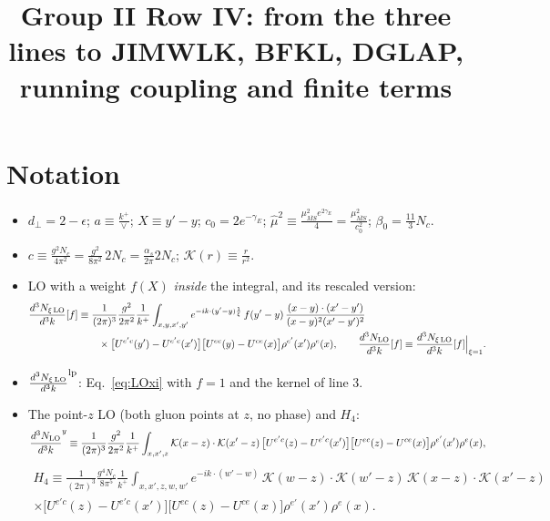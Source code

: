 \documentclass[10pt]{article}
\title{Group II Row IV: from the three lines to JIMWLK, BFKL, DGLAP, running coupling and finite terms}
\date{}
\numberwithin{equation}{section}
\newcommand{\MSb}{\overline{MS}}
\newcommand{\NLO}[1]{\frac{d^3N_{#1}}{d^3k}}
\begin{document}
\maketitle

\section{Notation}
\begin{itemize}
\item $d_\perp=2-\epsilon$; $a\equiv\frac{k^+}{\vee}$; $X\equiv y'-y$; $c_0=2e^{-\gamma_E}$; $\hat\mu^2\equiv\frac{\mu^2_{\MSb}e^{2\gamma_E}}{4}=\frac{\mu^2_{\MSb}}{c_0^2}$; $\beta_0=\frac{11}{3}N_c$.
\item $c\equiv\frac{g^2N_c}{4\pi^2}=\frac{g^2}{8\pi^2}\,2N_c=\frac{\alpha_s}{2\pi}2N_c$; $\mathcal K(r)\equiv\frac{r}{r^2}$.
\item LO with a weight $f(X)$ \emph{inside} the integral, and its rescaled version:
\begin{align}
\NLO{\xi\,\rm LO}[f]&\equiv\frac{1}{(2\pi)^{3}}\frac{g^{2}}{2\pi^{2}}\frac{1}{k^{+}}\int_{x,y,x',y'}e^{-ik\cdot(y'-y)\frac1\xi}\,f(y'-y)\,\frac{(x-y)\cdot(x'-y')}{(x-y)^{2}(x'-y')^{2}}\notag\\
&\qquad\times\big[U^{e'c}(y')-U^{e'c}(x')\big]\big[U^{ec}(y)-U^{ce}(x)\big]\rho^{e'}(x')\rho^{e}(x),\qquad \NLO{\rm LO}[f]\equiv\NLO{\xi\,\rm LO}[f]\Big|_{\xi=1}.\label{eq:LOxi}
\end{align}
\item $\NLO{\xi\,\rm LO}^{\rm lp}$: Eq.~\eqref{eq:LOxi} with $f=1$ and the kernel of line 3.
\item The point-$z$ LO (both gluon points at $z$, no phase) and $H_4$:
\begin{equation}
\NLO{\rm LO}^{y}\equiv\frac{1}{(2\pi)^{3}}\frac{g^{2}}{2\pi^{2}}\frac{1}{k^{+}}\int_{x,x',z}\mathcal K(x-z)\cdot\mathcal K(x'-z)\,\big[U^{e'c}(z)-U^{e'c}(x')\big]\big[U^{ec}(z)-U^{ce}(x)\big]\rho^{e'}(x')\rho^{e}(x),
\end{equation}
\begin{multline}
H_4\equiv\frac{1}{(2\pi)^{3}}\frac{g^{4}N_c}{8\pi^{5}}\frac{1}{k^{+}}\int_{x,x',z,w,w'}e^{-ik\cdot(w'-w)}\,\mathcal K(w-z)\cdot\mathcal K(w'-z)\,\mathcal K(x-z)\cdot\mathcal K(x'-z)\\\times\big[U^{e'c}(z)-U^{e'c}(x')\big]\big[U^{ec}(z)-U^{ce}(x)\big]\rho^{e'}(x')\rho^{e}(x).
\end{multline}
\end{itemize}
\end{document}
